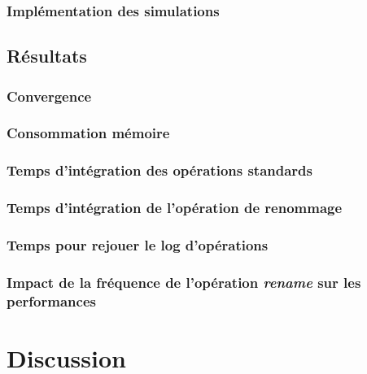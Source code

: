 \subsubsection{Implémentation des simulations}


\subsection{Résultats}


\subsubsection{Convergence}


\subsubsection{Consommation mémoire}


\subsubsection{Temps d'intégration des opérations standards}


\subsubsection{Temps d'intégration de l'opération de renommage}


\subsubsection{Temps pour rejouer le log d'opérations}


\subsubsection{Impact de la fréquence de l'opération \emph{rename} sur les performances}


\section{Discussion}

